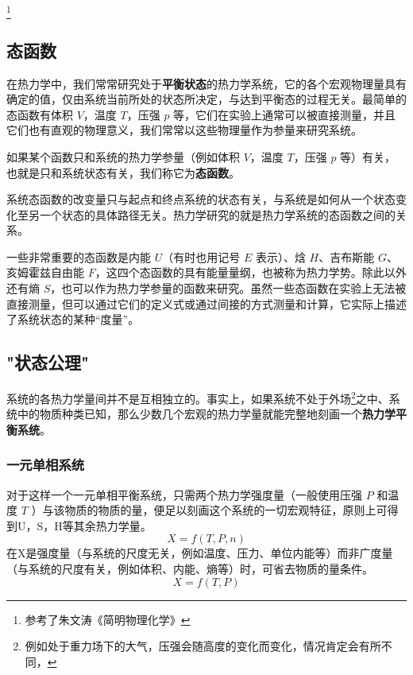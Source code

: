 \footnote{参考了朱文涛《简明物理化学》}

\subsection{态函数}
在热力学中，我们常常研究处于\textbf{平衡状态}的热力学系统，它的各个宏观物理量具有确定的值，仅由系统当前所处的状态所决定，与达到平衡态的过程无关。最简单的态函数有体积 $V$，温度 $T$，压强 $p$ 等，它们在实验上通常可以被直接测量，并且它们也有直观的物理意义，我们常常以这些物理量作为参量来研究系统。

如果某个函数只和系统的热力学参量（例如体积 $V$，温度 $T$，压强 $p$ 等）有关，也就是只和系统状态有关，我们称它为\textbf{态函数}。

系统态函数的改变量只与起点和终点系统的状态有关，与系统是如何从一个状态变化至另一个状态的具体路径无关。热力学研究的就是热力学系统的态函数之间的关系。

一些非常重要的态函数是内能 $U$（有时也用记号 $E$ 表示）、焓 $H$、吉布斯能 $G$、亥姆霍兹自由能 $F$，这四个态函数的具有能量量纲，也被称为热力学势。除此以外还有熵 $S$，也可以作为热力学参量的函数来研究。虽然一些态函数在实验上无法被直接测量，但可以通过它们的定义式或通过间接的方式测量和计算，它实际上描述了系统状态的某种“度量”。

\subsection{"状态公理"}
系统的各热力学量间并不是互相独立的。事实上，如果系统不处于外场\footnote{例如处于重力场下的大气，压强会随高度的变化而变化，情况肯定会有所不同，}之中、系统中的物质种类已知，那么少数几个宏观的热力学量就能完整地刻画一个\textbf{热力学平衡系统}。

\subsubsection{一元单相系统}
对于这样一个一元单相平衡系统，只需两个热力学强度量（一般使用压强 $P$ 和温度 $T$ ）与该物质的物质的量，便足以刻画这个系统的一切宏观特征，原则上可得到U，S，H等其余热力学量。
\begin{equation}
X=f(T,P,n)
\end{equation}
在X是强度量（与系统的尺度无关，例如温度、压力、单位内能等）而非广度量（与系统的尺度有关，例如体积、内能、熵等）时，可省去物质的量条件。
\begin{equation}
X=f(T,P)
\end{equation}

